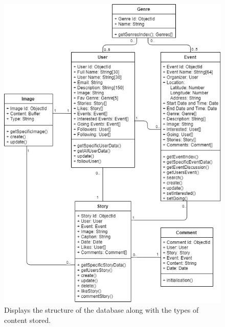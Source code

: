 \documentclass[11pt, a4paper]{article}
\begin{document}
\begin{figure}[H]
  \begin{center}
    \includegraphics[width=15cm]{uml.jpg}
    \caption{Displays the structure of the database along with the types of content stored.}
    \label{figure:uml}
  \end{center}
\end{figure}
\end{document}
